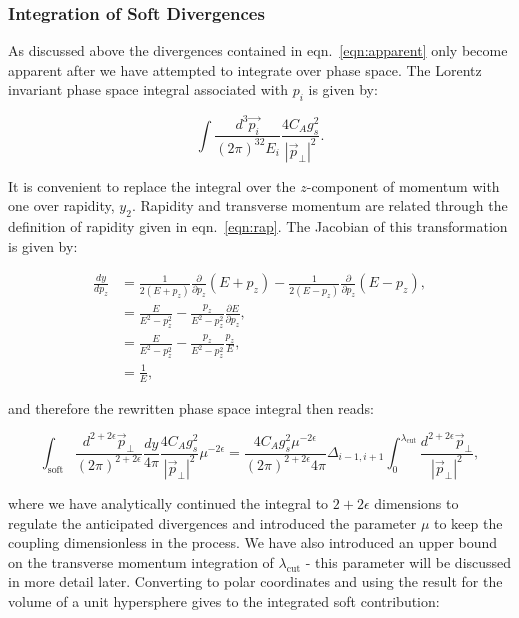 		\subsubsection{Integration of Soft Divergences}
			\label{sub:subsection_name}

			As discussed above the divergences contained in eqn.~\eqref{eqn:apparent} only become
			apparent after we have attempted to integrate over phase space.  The Lorentz
			invariant phase space integral associated with $p_i$ is given by:

			\begin{equation}
				\int\frac{d^3\vec{p_i}}{(2\pi)^32E_i}\frac{4C_Ag_s^2}{|\vec{p}_\perp|^2}.
			\end{equation}

			It is convenient to replace the integral over the $z$-component of momentum with one over rapidity,
			$y_2$.  Rapidity and transverse momentum are related through the definition of rapidity given
			in eqn.~\eqref{eqn:rap}.  The Jacobian of this transformation is given by:

			\begin{align*}
				\frac{dy}{dp_z} &= \frac{1}{2(E+p_z)} \frac{\partial}{\partial p_z}(E+p_z) - \frac{1}{2(E-p_z)}\frac{\partial}{\partial p_z}(E-p_z),\\
				&= \frac{E}{E^2-p_z^2} - \frac{p_z}{E^2-p_z^2}\frac{\partial E}{\partial p_z},\\
				&= \frac{E}{E^2-p_z^2} - \frac{p_z}{E^2-p_z^2}\frac{p_z}{E},\\
				&= \frac{1}{E},
			\end{align*}

			and therefore the rewritten phase space integral then reads:

			\begin{equation}
				\int_{\text{soft}}\frac{d^{2+2\epsilon}\vec{p}_{\perp}}{(2\pi)^{2+2\epsilon}}\frac{dy}{4\pi}\frac{4C_Ag_s^2}
					{|\vec{p}_\perp|^2}\mu^{-2\epsilon} = \frac{4C_Ag_s^2\mu^{-2\epsilon}}{(2\pi)^{2+2\epsilon}4\pi}
					\Delta_{i-1, i+1}\int_0^{\lambda_{\text{cut}}}\frac{d^{2+2\epsilon}\vec{p}_{\perp}}{|\vec{p}_\perp|^2},
			\end{equation}

			where we have analytically continued the integral to $2+2\epsilon$ dimensions to regulate the anticipated
			divergences and introduced the parameter $\mu$ to keep the coupling dimensionless in the process.
			We have also introduced an upper bound on the transverse momentum integration of $\lambda_{\text{cut}}$ -
			this parameter will be discussed in more detail later.
			Converting to polar coordinates and using the result for the volume of a unit hypersphere gives
			to the integrated soft contribution:

